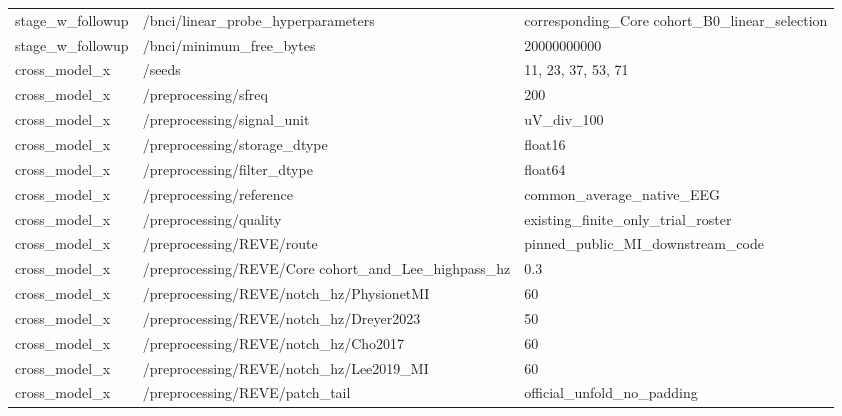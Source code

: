 \begin{longtable}{p{.65in}p{2.8in}p{3.2in}}
stage\_\allowbreak{}w\_\allowbreak{}followup & /bnci/linear\_\allowbreak{}probe\_\allowbreak{}hyperparameters & corresponding\_\allowbreak{}Core cohort\_\allowbreak{}B0\_\allowbreak{}linear\_\allowbreak{}selection \\
stage\_\allowbreak{}w\_\allowbreak{}followup & /bnci/minimum\_\allowbreak{}free\_\allowbreak{}bytes & 20000000000 \\
cross\_\allowbreak{}model\_\allowbreak{}x & /seeds & 11, 23, 37, 53, 71 \\
cross\_\allowbreak{}model\_\allowbreak{}x & /preprocessing/sfreq & 200 \\
cross\_\allowbreak{}model\_\allowbreak{}x & /preprocessing/signal\_\allowbreak{}unit & uV\_\allowbreak{}div\_\allowbreak{}100 \\
cross\_\allowbreak{}model\_\allowbreak{}x & /preprocessing/storage\_\allowbreak{}dtype & float16 \\
cross\_\allowbreak{}model\_\allowbreak{}x & /preprocessing/filter\_\allowbreak{}dtype & float64 \\
cross\_\allowbreak{}model\_\allowbreak{}x & /preprocessing/reference & common\_\allowbreak{}average\_\allowbreak{}native\_\allowbreak{}EEG \\
cross\_\allowbreak{}model\_\allowbreak{}x & /preprocessing/quality & existing\_\allowbreak{}finite\_\allowbreak{}only\_\allowbreak{}trial\_\allowbreak{}roster \\
cross\_\allowbreak{}model\_\allowbreak{}x & /preprocessing/REVE/route & pinned\_\allowbreak{}public\_\allowbreak{}MI\_\allowbreak{}downstream\_\allowbreak{}code \\
cross\_\allowbreak{}model\_\allowbreak{}x & /preprocessing/REVE/Core cohort\_\allowbreak{}and\_\allowbreak{}Lee\_\allowbreak{}highpass\_\allowbreak{}hz & 0.3 \\
cross\_\allowbreak{}model\_\allowbreak{}x & /preprocessing/REVE/notch\_\allowbreak{}hz/PhysionetMI & 60 \\
cross\_\allowbreak{}model\_\allowbreak{}x & /preprocessing/REVE/notch\_\allowbreak{}hz/Dreyer2023 & 50 \\
cross\_\allowbreak{}model\_\allowbreak{}x & /preprocessing/REVE/notch\_\allowbreak{}hz/Cho2017 & 60 \\
cross\_\allowbreak{}model\_\allowbreak{}x & /preprocessing/REVE/notch\_\allowbreak{}hz/Lee2019\_\allowbreak{}MI & 60 \\
cross\_\allowbreak{}model\_\allowbreak{}x & /preprocessing/REVE/patch\_\allowbreak{}tail & official\_\allowbreak{}unfold\_\allowbreak{}no\_\allowbreak{}padding \\

\end{longtable}
